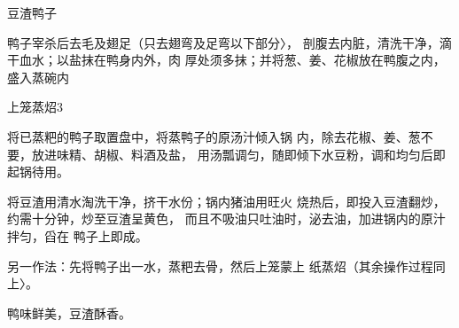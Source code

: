 \begin{recipe}{豆渣鸭子}

\ingredients




\cooking

鸭子宰杀后去毛及翅足（只去翅弯及足弯以下部分〉， 剖腹去内脏，清洗干净，滴干血水；以盐抹在鸭身内外，肉 厚处须多抹；并将葱、姜、花椒放在鸭腹之内，盛入蒸碗内

上笼蒸炤3

\step 将已蒸粑的鸭子取置盘中，将蒸鸭子的原汤汁倾入锅 内，除去花椒、姜、葱不要，放进味精、胡椒、料酒及盐， 用汤瓢调匀，随即倾下水豆粉，调和均匀后即起锅待用。

\step 将豆渣用清水淘洗干净，挤干水份；锅内猪油用旺火 烧热后，即投入豆渣翻炒，约需十分钟，炒至豆渣呈黄色， 而且不吸油只吐油时，泌去油，加进锅内的原汁拌匀，舀在 鸭子上即成。

另一作法：先将鸭子出一水，蒸粑去骨，然后上笼蒙上 纸蒸炤（其余操作过程同上〉。

\notes

鸭味鲜美，豆渣酥香。

\end{recipe}


